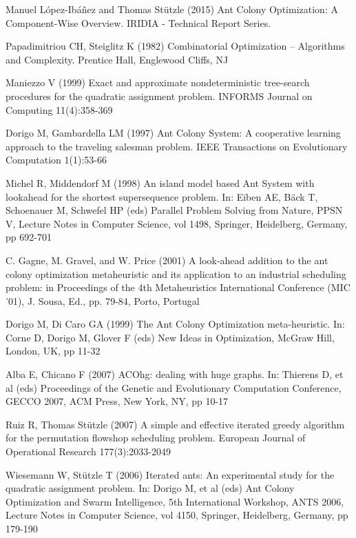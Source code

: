 \documentclass[12pt]{article}
\begin{document}
\begin{thebibliography}{1}

 Manuel L{\'o}pez-Ib{\'a}{\~n}ez and Thomas St{\"u}tzle (2015) Ant Colony Optimization: A Component-Wise Overview.  IRIDIA - Technical Report Series.

 Papadimitriou CH, Steiglitz K (1982) Combinatorial Optimization – Algorithms and Complexity. Prentice Hall, Englewood Cliffs, NJ

 Maniezzo V (1999) Exact and approximate nondeterministic tree-search procedures for the quadratic assignment problem. INFORMS Journal on Computing 11(4):358-369

 Dorigo M, Gambardella LM (1997) Ant Colony System: A cooperative learning approach to the traveling salesman problem. IEEE Transactions on Evolutionary Computation 1(1):53-66

 Michel R, Middendorf M (1998) An island model based Ant System with lookahead for the shortest supersequence problem. In: Eiben AE, Bäck T, Schoenauer M, Schwefel HP (eds) Parallel Problem Solving from Nature, PPSN V, Lecture Notes in Computer Science, vol 1498, Springer, Heidelberg, Germany, pp 692-701

 C. Gagne, M. Gravel, and W. Price (2001) A look-ahead addition to the ant colony optimization metaheuristic and its application to an industrial scheduling problem: in Proceedings of the 4th Metaheuristics International Conference (MIC ’01), J. Sousa, Ed., pp. 79-84, Porto, Portugal

 Dorigo M, Di Caro GA (1999) The Ant Colony Optimization meta-heuristic. In: Corne D, Dorigo M, Glover F (eds) New Ideas in Optimization, McGraw Hill, London, UK, pp 11-32

 Alba E, Chicano F (2007) ACOhg: dealing with huge graphs. In: Thierens D, et al (eds) Proceedings of the Genetic and Evolutionary Computation Conference, GECCO 2007, ACM Press, New York, NY, pp 10-17

 Ruiz R, Thomas St{\"u}tzle (2007) A simple and effective iterated greedy algorithm for the permutation flowshop scheduling problem. European Journal of Operational Research 177(3):2033-2049

 Wiesemann W, St{\"u}tzle T (2006) Iterated ants: An experimental study for the quadratic assignment problem. In: Dorigo M, et al (eds) Ant Colony Optimization and Swarm Intelligence, 5th International Workshop, ANTS 2006, Lecture Notes in Computer Science, vol 4150, Springer, Heidelberg, Germany, pp 179-190


\end{thebibliography}
\end{document}
